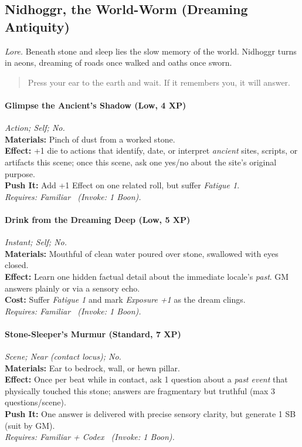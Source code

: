 
\subsection{Nidhoggr, the World-Worm (Dreaming Antiquity)}
\textit{Lore.} Beneath stone and sleep lies the slow memory of the world. Nidhoggr turns in aeons, dreaming of roads once walked and oaths once sworn.

\begin{quote}
Press your ear to the earth and wait. If it remembers you, it will answer.
\end{quote}

\paragraph{Glimpse the Ancient's Shadow (Low, 4 XP)} \emph{Action; Self; No.}\\
\textbf{Materials:} Pinch of dust from a worked stone.\\
\textbf{Effect:} +1 die to actions that identify, date, or interpret \emph{ancient} sites, scripts, or artifacts this scene; once this scene, ask one yes/no about the site's original purpose.\\
\textbf{Push It:} Add +1 Effect on one related roll, but suffer \emph{Fatigue 1}.\\
\emph{Requires: Familiar \ (\textit{Invoke:} 1 Boon).}

\paragraph{Drink from the Dreaming Deep (Low, 5 XP)} \emph{Instant; Self; No.}\\
\textbf{Materials:} Mouthful of clean water poured over stone, swallowed with eyes closed.\\
\textbf{Effect:} Learn one hidden factual detail about the immediate locale's \emph{past}. GM answers plainly or via a sensory echo.\\
\textbf{Cost:} Suffer \emph{Fatigue 1} and mark \emph{Exposure +1} as the dream clings.\\
\emph{Requires: Familiar \ (\textit{Invoke:} 1 Boon).}

\paragraph{Stone-Sleeper's Murmur (Standard, 7 XP)} \emph{Scene; Near (contact locus); No.}\\
\textbf{Materials:} Ear to bedrock, wall, or hewn pillar.\\
\textbf{Effect:} Once per beat while in contact, ask 1 question about a \emph{past event} that physically touched this stone; answers are fragmentary but truthful (max 3 questions/scene).\\
\textbf{Push It:} One answer is delivered with precise sensory clarity, but generate 1 SB (suit by GM).\\
\emph{Requires: Familiar + Codex \ (\textit{Invoke:} 1 Boon).}

